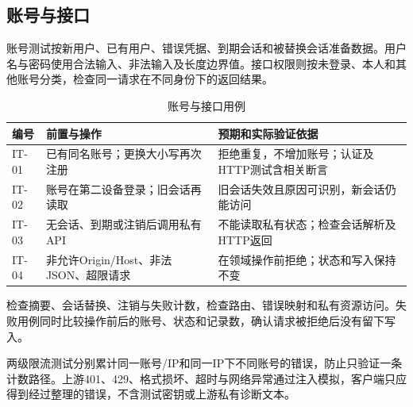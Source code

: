 \subsection*{账号与接口}
账号测试按新用户、已有用户、错误凭据、到期会话和被替换会话准备数据。用户名与密码使用合法输入、非法输入及长度边界值。接口权限则按未登录、本人和其他账号分类，检查同一请求在不同身份下的返回结果。

\begin{table}[H]\centering\small
\caption{账号与接口用例}
\begin{tabularx}{\linewidth}{@{}p{15mm}p{38mm}X@{}}\toprule
编号 & 前置与操作 & 预期和实际验证依据 \\ \midrule
IT-01 & 已有同名账号；更换大小写再次注册 & 拒绝重复，不增加账号；认证及HTTP测试含相关断言 \\
IT-02 & 账号在第二设备登录；旧会话再读取 & 旧会话失效且原因可识别，新会话仍能访问 \\
IT-03 & 无会话、到期或注销后调用私有API & 不能读取私有状态；检查会话解析及HTTP返回 \\
IT-04 & 非允许Origin/Host、非法JSON、超限请求 & 在领域操作前拒绝；状态和写入保持不变 \\ \bottomrule
\end{tabularx}\end{table}

检查摘要、会话替换、注销与失败计数，检查路由、错误映射和私有资源访问。失败用例同时比较操作前后的账号、状态和记录数，确认请求被拒绝后没有留下写入。

两级限流测试分别累计同一账号/IP和同一IP下不同账号的错误，防止只验证一条计数路径。上游401、429、格式损坏、超时与网络异常通过注入模拟，客户端只应得到经过整理的错误，不含测试密钥或上游私有诊断文本。
